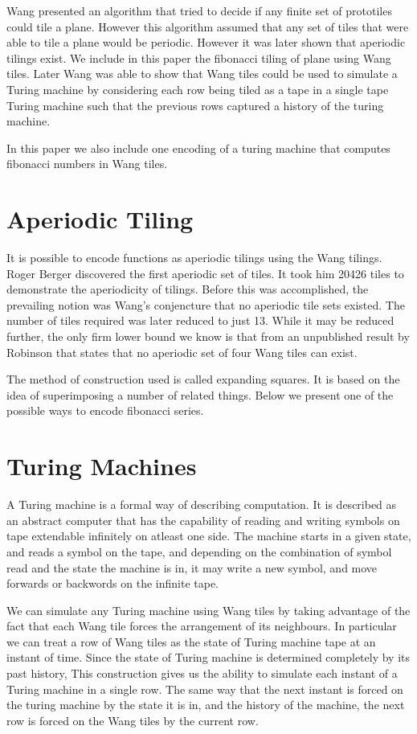 \documentclass{article}
\begin{document}
Wang presented an algorithm that tried to decide if any finite set of prototiles could tile a plane. However this algorithm assumed that any set of tiles that were able to tile a plane would be periodic. However it was later shown that aperiodic tilings exist. We include in this paper the fibonacci tiling of plane using Wang tiles. Later Wang was able to show that Wang tiles could be used to simulate a Turing machine by considering each row being tiled as a tape in a single tape Turing machine such that the previous rows captured a history of the turing machine.

In this paper we also include one encoding of a turing machine that computes fibonacci numbers in Wang tiles.

\section*{Aperiodic Tiling}
It is possible to encode functions as aperiodic tilings using the Wang tilings. Roger Berger discovered the first aperiodic set of tiles\cite{undecide}. It took him 20426 tiles to demonstrate the aperiodicity of tilings. Before this was accomplished, the prevailing notion was Wang's conjencture that no aperiodic tile sets existed. The number of tiles required was later reduced to just 13. While it may be reduced further, the only firm lower bound we know is that from an unpublished result by Robinson that states that no aperiodic set of four Wang tiles can exist.

The method of construction used is called expanding squares. It is based on the idea of superimposing a number of related things. Below we present one of the possible ways to encode fibonacci series.

\section*{Turing Machines}
A Turing machine is a formal way of describing computation. It is described as an abstract computer that has the capability of reading and writing symbols on tape extendable infinitely on atleast one side. The machine starts in a given state, and reads a symbol on the tape, and depending on the combination of symbol read and the state the machine is in, it may write a new symbol, and move forwards or backwords on the infinite tape.

We can simulate any Turing machine using Wang tiles by taking advantage of the fact that each Wang tile forces the arrangement of its neighbours. In particular we can treat a row of Wang tiles as the state of Turing machine tape at an instant of time. Since the state of Turing machine is determined completely by its past history, This construction gives us the ability to simulate each instant of a Turing machine in a single row. The same way that the next instant is forced on the turing machine by the state it is in, and the history of the machine, the next row is forced on the Wang tiles by the current row.
\end{document}
